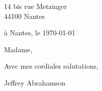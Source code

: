 \documentclass[12 pt]{article}
\begin{document}
14 bis rue Metzinger\\
44100 Nantes

\vspace{3mm}

\hbox{\hspace{.6\linewidth}\vtop{
}}

\vspace{1cm}

\hspace{.6\linewidth}à Nantes, le \today\\[2mm]
\vspace{1cm}

Madame,



Avec mes cordiales salutations,

\vspace{2cm}
Jeffrey Abrahamson
\end{document}
